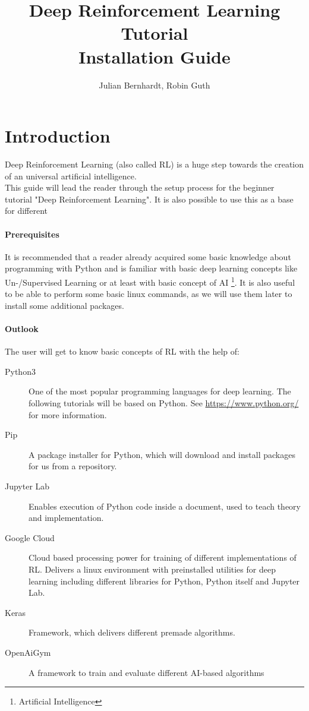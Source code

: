 \documentclass[a4paper]{article}
\title{Deep Reinforcement Learning Tutorial \\Installation Guide}
\author{Julian Bernhardt, Robin Guth}
\begin{document}
\maketitle
\tableofcontents

\section{Introduction}
Deep Reinforcement Learning (also called RL) is a huge step towards the creation of an universal artificial intelligence.\\ %
This guide will lead the reader through the setup process for the beginner tutorial "Deep Reinforcement Learning". It is also possible to use this as a base for different 
\paragraph{Prerequisites}
It is recommended that a reader already acquired some basic knowledge about programming with Python and is familiar with basic deep learning concepts like Un-/Supervised Learning or at least with basic concept of AI \footnote{Artificial Intelligence}. It is also useful to be able to perform some basic linux commands, as we will use them later to install some additional packages.
\paragraph{Outlook}
The user will get to know basic concepts of RL with the help of:
\begin{description}
	\item[Python3] One of the most popular programming languages for deep learning. The following tutorials will be based on Python. See \url{https://www.python.org/} for more information.
	\item[Pip] A package installer for Python, which will download and install packages for us from a repository.
	\item[Jupyter Lab] Enables execution of Python code inside a document, used to teach theory and implementation. 
	\item[Google Cloud] Cloud based processing power for training of different implementations of RL. Delivers a linux environment with preinstalled utilities for deep learning including different libraries for Python, Python itself and Jupyter Lab.
	\item[Keras] Framework, which delivers different premade algorithms.
	\item[OpenAiGym] A framework to train and evaluate different AI-based algorithms
\end{description}  
\end{document}

